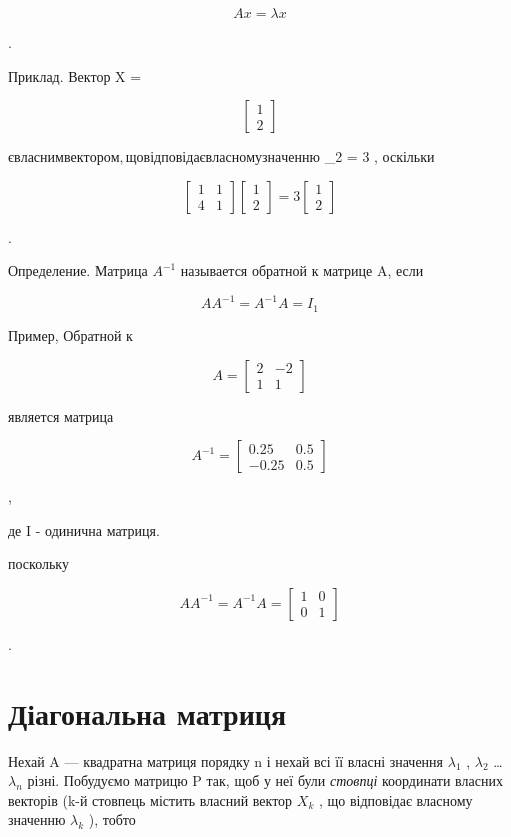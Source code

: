 \documentclass[
  ukrainian,
]{article}
\begin{document}
\[
Ax = \lambda x
\]

.

Приклад. Вектор X =

\[
\begin{bmatrix} 1 \\ 2 \end{bmatrix}
\]

\(є власним вектором, що відповідає власному значенню\) \lambda\_2 = 3 ,
оскільки

\[
\begin{bmatrix} 1 & 1 \\ 4 & 1 \end{bmatrix}
\begin{bmatrix} 1 \\ 2 \end{bmatrix}
= 3
\begin{bmatrix} 1 \\ 2 \end{bmatrix}
\]

.

Определение. Матрица \(A^{-1}\) называется обратной к матрице A, если

\[
AA^{-1} = A^{-1}A = I_1
\]

Пример, Обратной к

\[
A =
\begin{bmatrix} 2 & -2 \\ 1 & 1 \end{bmatrix}
\]

является матрица

\[
A^{-1} =
\begin{bmatrix} 0.25 & 0.5 \\ -0.25 & 0.5 \end{bmatrix}
\]

,

де I - одинична матриця.

поскольку

\[
AA^{-1} = A^{-1}A =
\begin{bmatrix} 1 & 0 \\ 0 & 1 \end{bmatrix}
\]

.

\section{Діагональна
матриця}\label{ux434ux456ux430ux433ux43eux43dux430ux43bux44cux43dux430-ux43cux430ux442ux440ux438ux446ux44f}

Нехай A --- квадратна матриця порядку n і нехай всі її власні значення
\(\lambda_1\) , \(\lambda_2\) \ldots{} \(\lambda_n\) різні. Побудуємо
матрицю P так, щоб у неї були \emph{стовпці} координати власних векторів
(k-й стовпець містить власний вектор \(X_k\) , що відповідає власному
значенню \(\lambda_k\) ), тобто
\end{document}

